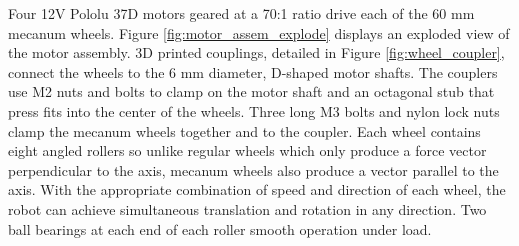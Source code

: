 Four 12V Pololu 37D motors geared at a 70:1 ratio drive each of the 60 mm mecanum wheels. Figure \ref{fig:motor_assem_explode} displays an exploded view of the motor assembly. 3D printed couplings, detailed in Figure \ref{fig:wheel_coupler}, connect the wheels to the 6 mm diameter, D-shaped motor shafts. The couplers use M2 nuts and bolts to clamp on the motor shaft and an octagonal stub that press fits into the center of the wheels. Three long M3 bolts and nylon lock nuts clamp the mecanum wheels together and to the coupler. Each wheel contains eight angled rollers so unlike regular wheels which only produce a force vector perpendicular to the axis, mecanum wheels also produce a vector parallel to the axis. With the appropriate combination of speed and direction of each wheel, the robot can achieve simultaneous translation and rotation in any direction. Two ball bearings at each end of each roller smooth operation under load.

